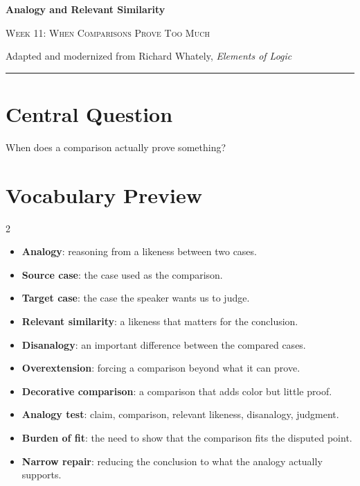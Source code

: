 \documentclass[12pt]{article}
\begin{document}
\begin{center}
{\LARGE\bfseries Analogy and Relevant Similarity}\par\vspace{0.25em}
{\large\scshape Week 11: When Comparisons Prove Too Much}\par\vspace{0.5em}
{Adapted and modernized from Richard Whately, \textit{Elements of Logic}}\par\vspace{0.6em}
\rule{0.82\textwidth}{0.4pt}
\end{center}

\section*{Central Question}
When does a comparison actually prove something?

\section*{Vocabulary Preview}
\begin{multicols}{2}
\begin{itemize}[leftmargin=*, itemsep=0.18em]
\item \textbf{Analogy}: reasoning from a likeness between two cases.
\item \textbf{Source case}: the case used as the comparison.
\item \textbf{Target case}: the case the speaker wants us to judge.
\item \textbf{Relevant similarity}: a likeness that matters for the conclusion.
\item \textbf{Disanalogy}: an important difference between the compared cases.
\item \textbf{Overextension}: forcing a comparison beyond what it can prove.
\item \textbf{Decorative comparison}: a comparison that adds color but little proof.
\item \textbf{Analogy test}: claim, comparison, relevant likeness, disanalogy, judgment.
\item \textbf{Burden of fit}: the need to show that the comparison fits the disputed point.
\item \textbf{Narrow repair}: reducing the conclusion to what the analogy actually supports.
\end{itemize}
\end{multicols}
\end{document}
